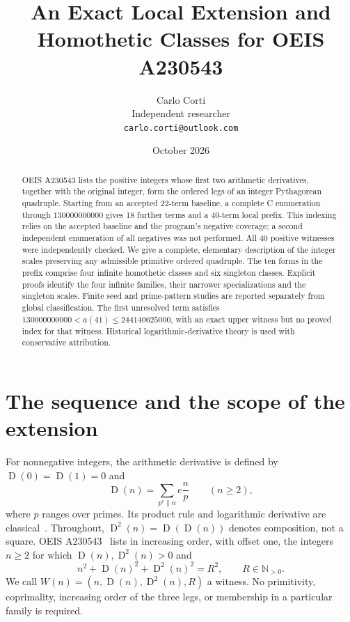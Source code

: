 \documentclass[11pt]{article}
\title{An Exact Local Extension and Homothetic Classes for OEIS A230543}
\author{Carlo Corti\\Independent researcher\\\texttt{carlo.corti@outlook.com}}
\date{October 2026}
\newcommand{\D}{\operatorname{D}}
\newcommand{\NN}{\mathbb{N}}
\theoremstyle{definition}
\begin{document}
\maketitle

\begin{abstract}
OEIS A230543 lists the positive integers whose first two arithmetic
derivatives, together with the original integer, form the ordered legs of
an integer Pythagorean quadruple. Starting from an accepted 22-term
baseline, a complete C enumeration through $130000000000$ gives 18 further
terms and a 40-term local prefix. This indexing relies on the accepted
baseline and the program's negative coverage; a second independent
enumeration of all negatives was not performed. All 40 positive witnesses
were independently checked. We give a complete, elementary description of
the integer scales preserving any admissible primitive ordered quadruple.
The ten forms in the prefix comprise four infinite homothetic classes and
six singleton classes. Explicit proofs identify the four infinite families,
their narrower specializations and the singleton scales. Finite seed and
prime-pattern studies are reported separately from global classification.
The first unresolved term satisfies
$130000000000<a(41)\le244140625000$, with an exact upper witness but no
proved index for that witness. Historical logarithmic-derivative theory is
used with conservative attribution.
\end{abstract}

\section{The sequence and the scope of the extension}\label{sec:intro}
For nonnegative integers, the arithmetic derivative is defined by
$\D(0)=\D(1)=0$ and
\begin{equation}\label{eq:derivative}
 \D(n)=\sum_{p^e\parallel n}e\frac{n}{p}\qquad(n\ge2),
\end{equation}
where $p$ ranges over primes. Its product rule and logarithmic derivative
are classical~\cite{ufnarovski,kovic}. Throughout,
$\D^2(n)=\D(\D(n))$ denotes composition, not a square.
OEIS A230543~\cite{sequence} lists in increasing order, with offset one,
the integers $n\ge2$ for which $\D(n),\D^2(n)>0$ and
\begin{equation}\label{eq:predicate}
 n^2+\D(n)^2+\D^2(n)^2=R^2,\qquad R\in\NN_{>0}.
\end{equation}
We call $W(n)=(n,\D(n),\D^2(n),R)$ a witness. No primitivity,
coprimality, increasing order of the three legs, or membership in a
particular family is required.
\end{document}
